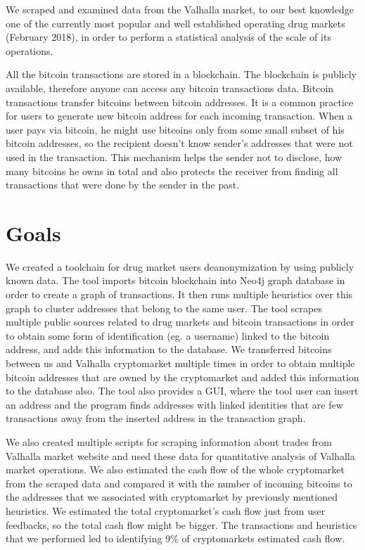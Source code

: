 \documentclass[
  digital, %
  table,   %
  lof,     %
  lot,     %
  oneside
]{fithesis3}
\begin{document}
We scraped and examined data from the Valhalla market,
 to our best knowledge one of the currently most popular and well established operating drug markets (February 2018),
in order to perform a statistical analysis of the scale of its operations.

All the bitcoin transactions are stored in a blockchain. The blockchain is
publicly available, therefore anyone can access any bitcoin transactions data.
Bitcoin transactions transfer bitcoins between bitcoin addresses. It is a common practice for users
to generate new bitcoin address for each incoming transaction.
When a user pays via bitcoin, he might use bitcoins only from some small subset of his bitcoin addresses,
so the recipient doesn't know sender's addresses that were not used in the transaction.
This mechanism helps the sender not to disclose, how many bitcoins he owns in total and also
protects the receiver from finding all transactions that were done by the sender in the past.

\section{Goals}

We created a toolchain for drug market users deanonymization by using publicly known data.
The tool imports bitcoin blockchain into Neo4j graph database in order to create a graph of transactions.
It then runs multiple heuristics over this graph to cluster addresses that belong to the same user.
The tool scrapes multiple public sources related to drug markets and bitcoin transactions in order
to obtain some form of identification (eg. a username) linked to the bitcoin address, and adds this information to the database.
We transferred bitcoins between us and Valhalla cryptomarket multiple times in order to obtain
multiple bitcoin addresses that are owned by the cryptomarket and added this information to the database also.
The tool also provides a GUI, where the tool user can insert an address and the program finds addresses with linked identities
that are few transactions away from the inserted address in the transaction graph.

We also created multiple scripts for scraping information about trades from Valhalla market website
and used these data for quantitative analysis of Valhalla market operations.
We also estimated the cash flow of the whole cryptomarket from the scraped data and compared
it with the number of incoming bitcoins to the addresses that we associated with cryptomarket
by previously mentioned heuristics.
We estimated the total cryptomarket's cash flow just from user feedbacks, so the total cash flow might be bigger.
The transactions and heuristics that we performed led to identifying 9\% of cryptomarkets estimated cash flow.
\end{document}
